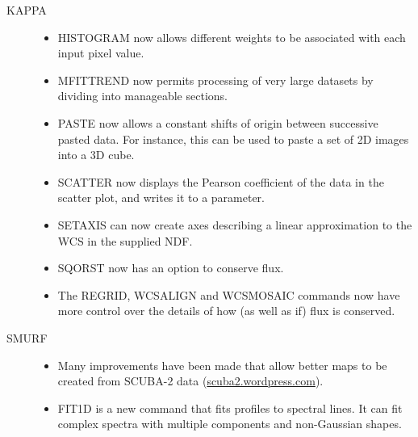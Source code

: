 \documentclass[11pt,twoside]{article}
\begin{document}
\begin{description}
\item[KAPPA] \hfill
\begin{itemize}
\item HISTOGRAM now allows different weights to be associated with each input pixel value.
\item MFITTREND now permits processing of very large datasets by dividing into manageable sections.
\item PASTE now allows a constant shifts of origin between successive pasted data. For instance, this can be used to paste a set of 2D images into a 3D cube.
\item SCATTER now displays the Pearson coefficient of the data in the scatter plot, and writes it to a parameter.
\item SETAXIS can now create axes describing a linear approximation to the WCS in the supplied NDF.
\item SQORST now has an option to conserve flux.
\item The REGRID, WCSALIGN and WCSMOSAIC commands now have more control over the details of how (as well as if) flux is conserved.
\end{itemize}

\item[SMURF] \hfill
\begin{itemize}
\item Many improvements have been made that allow better maps to be
created from SCUBA-2 data (\url{scuba2.wordpress.com}).
\item FIT1D is a new command that fits profiles to spectral lines.  It can fit complex spectra with multiple components and non-Gaussian shapes.
\end{itemize}

\end{description}
\end{document}
